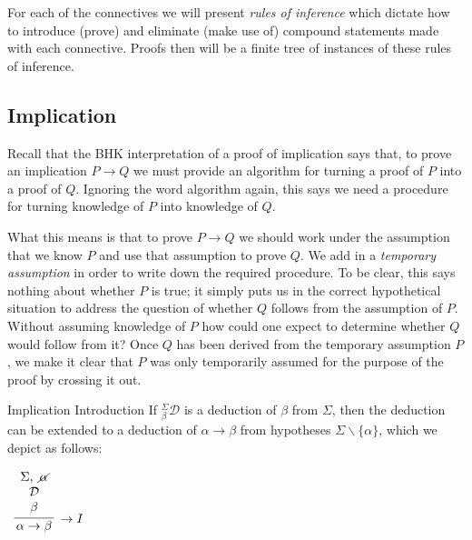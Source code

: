 \documentclass{book}
\begin{document}
    For each of the connectives we will present \emph{rules of inference} which dictate how to introduce (prove) and eliminate (make use of) compound statements made with each connective. Proofs then will be a finite tree of instances of these rules of inference. 

    
    \newpage
    \subsection{Implication}

    Recall that the BHK interpretation of a proof of implication says that, to prove an implication $P \to Q$ we must provide an algorithm for turning a proof of $P$ into a proof of $Q$. Ignoring the word algorithm again, this says we need a procedure for turning knowledge of $P$ into knowledge of $Q$. 

    What this means is that to prove $P \to Q$ we should work under the assumption that we know $P$ and use that assumption to prove $Q$. We add in a \emph{temporary assumption} in order to write down the required procedure. To be clear, this says nothing about whether $P$ is true; it simply puts us in the correct hypothetical situation to address the question of whether $Q$ follows from the assumption of $P$. Without assuming knowledge of $P$ how could one expect to determine whether $Q$ would follow from it? Once $Q$ has been derived from the temporary assumption $P$, we make it clear that $P$ was only temporarily assumed for the purpose of the proof by crossing it out. 

    \vspace{0.1cm}

    \begin{definition}{Implication Introduction}
        If $^{\Sigma}_{\beta}\mathcal{D}$ is a deduction of $\beta$ from $\Sigma$, then the deduction can be extended to a deduction of $\alpha \rightarrow \beta$ from hypotheses $\Sigma \backslash \{\alpha\}$, which we depict as follows: 

        \begin{center}
            $\begin{array}{c}		
                \infer[\rightarrow I]{\alpha \rightarrow \beta}
                    {\begin{array}{c} \Sigma, \ \cancel{\alpha} \\ \mathcal{D} \\ \beta \end{array}}
            \end{array}$
        \end{center}
    \end{definition}
\end{document}
